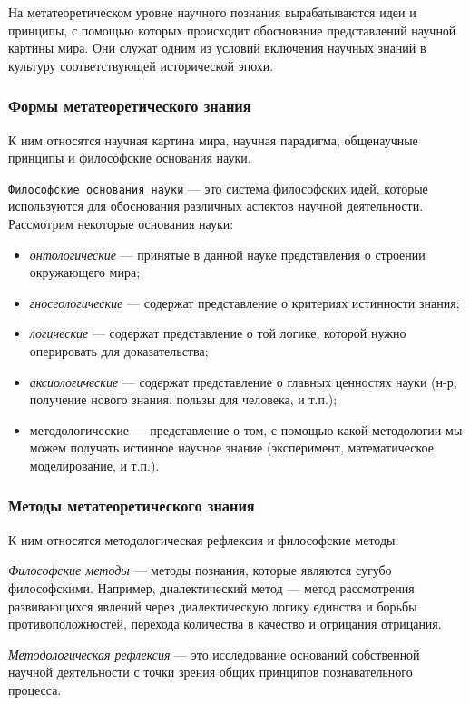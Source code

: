 На метатеоретическом уровне научного познания вырабатываются идеи и принципы, 
с помощью которых происходит обоснование представлений научной картины мира. 
Они служат одним из условий включения научных знаний в культуру соответствующей 
исторической эпохи. 

\subsubsection{Формы метатеоретического знания}

К ним относятся научная картина мира, научная парадигма, общенаучные принципы и философские основания науки.

\texttt{Философские основания науки} --- это
система философских идей, которые используются для обоснования различных
аспектов научной деятельности. Рассмотрим некоторые основания науки:

\begin{itemize}
    \item \textit{онтологические} --- принятые в данной науке представления о строении окружающего мира;
    \item \textit{гносеологические} --- содержат представление о критериях истинности знания;
    \item \textit{логические} --- содержат представление о той логике, которой нужно оперировать для доказательства;
    \item \textit{аксиологические} --- содержат представление о главных ценностях науки (н-р, получение нового знания, пользы для человека, и т.п.);
    \item {методологические} --- представление о том, с помощью какой методологии мы можем получать истинное научное знание (эксперимент, математическое моделирование, и т.п.).
\end{itemize}

\subsubsection{Методы метатеоретического знания}

К ним относятся методологическая рефлексия и философские методы.

\textit{Философские методы} --- методы познания, которые являются сугубо философскими. 
Например, диалектический метод --- метод рассмотрения
развивающихся явлений через диалектическую логику единства и борьбы
противоположностей, перехода количества в качество и отрицания отрицания.

\textit{Методологическая рефлексия} --- это исследование оснований собственной научной
деятельности с точки зрения общих принципов познавательного процесса. 
